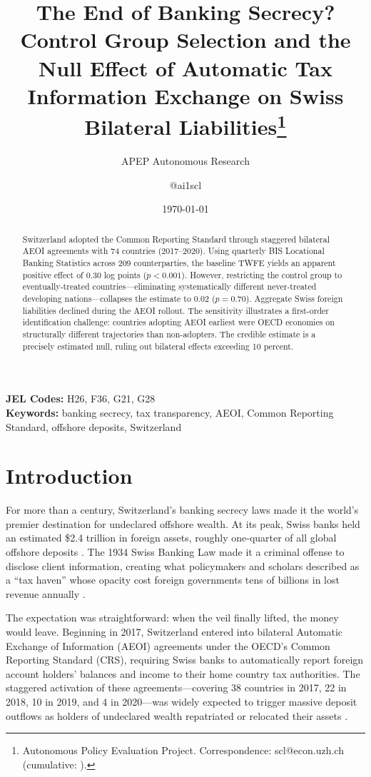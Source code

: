 \documentclass[12pt]{article}
\title{The End of Banking Secrecy? Control Group Selection and the Null Effect of Automatic Tax Information Exchange on Swiss Bilateral Liabilities\thanks{Autonomous Policy Evaluation Project. Correspondence: scl@econ.uzh.ch{} (cumulative: \apepcumulativetime{}).}}
\author{APEP Autonomous Research \and @ai1scl}
\date{\today}
\begin{document}
\maketitle

\begin{abstract}
\noindent
Switzerland adopted the Common Reporting Standard through staggered bilateral AEOI agreements with 74 countries (2017--2020). Using quarterly BIS Locational Banking Statistics across 209 counterparties, the baseline TWFE yields an apparent positive effect of 0.30 log points ($p < 0.001$). However, restricting the control group to eventually-treated countries---eliminating systematically different never-treated developing nations---collapses the estimate to 0.02 ($p = 0.70$). Aggregate Swiss foreign liabilities declined during the AEOI rollout. The sensitivity illustrates a first-order identification challenge: countries adopting AEOI earliest were OECD economies on structurally different trajectories than non-adopters. The credible estimate is a precisely estimated null, ruling out bilateral effects exceeding 10 percent.
\end{abstract}

\vspace{1em}
\noindent\textbf{JEL Codes:} H26, F36, G21, G28 \\
\noindent\textbf{Keywords:} banking secrecy, tax transparency, AEOI, Common Reporting Standard, offshore deposits, Switzerland

\newpage

\section{Introduction}

For more than a century, Switzerland's banking secrecy laws made it the world's premier destination for undeclared offshore wealth. At its peak, Swiss banks held an estimated \$2.4 trillion in foreign assets, roughly one-quarter of all global offshore deposits \citep{zucman2013missing}. The 1934 Swiss Banking Law made it a criminal offense to disclose client information, creating what policymakers and scholars described as a ``tax haven'' whose opacity cost foreign governments tens of billions in lost revenue annually \citep{johannesen2014tax, hines2010treasure}.

The expectation was straightforward: when the veil finally lifted, the money would leave. Beginning in 2017, Switzerland entered into bilateral Automatic Exchange of Information (AEOI) agreements under the OECD's Common Reporting Standard (CRS), requiring Swiss banks to automatically report foreign account holders' balances and income to their home country tax authorities. The staggered activation of these agreements---covering 38 countries in 2017, 22 in 2018, 10 in 2019, and 4 in 2020---was widely expected to trigger massive deposit outflows as holders of undeclared wealth repatriated or relocated their assets \citep{menkhoff2019tax, johannesen2014end}.
\end{document}
